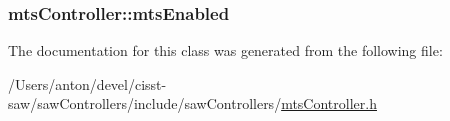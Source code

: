 \subsubsection[{mts\+Enabled}]{ mts\+Controller\+::mts\+Enabled\hspace{0.3cm}{\ttfamily [protected]}}\label{classmts_controller_a6461d669d02d7aae10d4fe9bf237d773}


The documentation for this class was generated from the following file\+:\begin{DoxyCompactItemize}
\item 
/\+Users/anton/devel/cisst-\/saw/saw\+Controllers/include/saw\+Controllers/\hyperlink{mts_controller_8h}{mts\+Controller.\+h}\end{DoxyCompactItemize}
